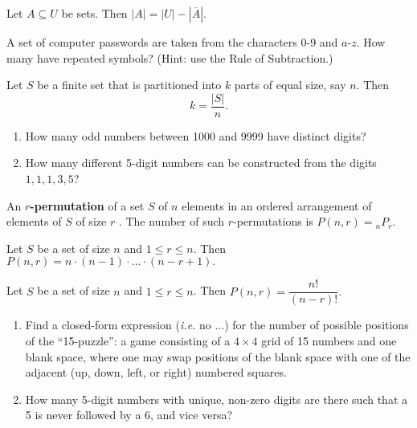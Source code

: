 \begin{theorem} Let $A \subseteq U$ be sets.  Then $|A| = |U| - |\overline{A}|$.  %
\end{theorem}

\begin{example} A set of computer passwords are taken from the characters 0-9 and $a$-$z$. How many have repeated symbols? (Hint: use the Rule of Subtraction.)
\end{example}

\begin{theorem} Let $S$ be a finite set that is partitioned into $k$ parts of equal size, say $n$.  Then $$k = \frac{|S|}{n}.$$
\end{theorem}

\begin{examples}
\begin{enumerate}
    \item How many odd numbers between 1000 and 9999 have distinct digits?
    \item How many different 5-digit numbers can be constructed from the digits $1, 1, 1, 3, 5$?
\end{enumerate}
\end{examples}

\begin{definition} An \textbf{$r$-permutation} of a set $S$ of $n$ elements in an ordered arrangement of elements of $S$ of size $r$ .  The number of such $r$-permutations is $P(n, r) = {}_n P_r$.
\end{definition}

\begin{theorem} Let $S$ be a set of size $n$ and $1 \leq r \leq n$.  Then $P(n, r) = n \cdot (n-1) \cdot \ldots \cdot (n-r+1).$
\end{theorem}

\begin{corollary} Let $S$ be a set of size $n$ and $1 \leq r \leq n$.  Then $P(n, r) = \dfrac{n!}{(n-r)!}.$
\end{corollary}

\begin{exercises}
\begin{enumerate}
    \item Find a closed-form expression (\textit{i.e.} no $\ldots$) for the number of possible positions of the ``15-puzzle'': a game consisting of a $4\times 4$ grid of 15 numbers and one blank space, where one may swap positions of the blank space with one of the adjacent (up, down, left, or right) numbered squares.
    \item How many 5-digit numbers with unique, non-zero digits are there such that a 5 is never followed by a 6, and vice versa?
\end{enumerate}
\end{exercises}

